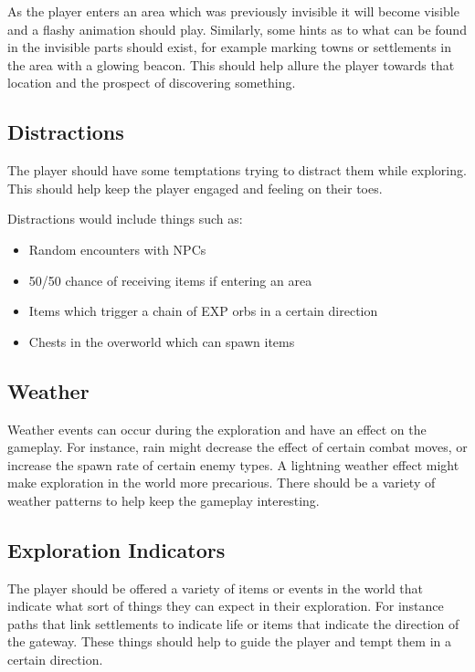\documentclass[a4paper]{scrreprt}
\begin{document}
As the player enters an area which was previously invisible it will become visible and a flashy animation should play.
Similarly, some hints as to what can be found in the invisible parts should exist, for example marking towns or settlements in the area with a glowing beacon.
This should help allure the player towards that location and the prospect of discovering something.

\subsection{Distractions}
The player should have some temptations trying to distract them while exploring.
This should help keep the player engaged and feeling on their toes.

Distractions would include things such as:

    \begin{itemize}
        \item Random encounters with NPCs
        \item 50/50 chance of receiving items if entering an area
        \item Items which trigger a chain of EXP orbs in a certain direction
        \item Chests in the overworld which can spawn items
    \end{itemize}

\subsection{Weather}
Weather events can occur during the exploration and have an effect on the gameplay.
For instance, rain might decrease the effect of certain combat moves, or increase the spawn rate of certain enemy types.
A lightning weather effect might make exploration in the world more precarious.
There should be a variety of weather patterns to help keep the gameplay interesting.

\subsection{Exploration Indicators}
The player should be offered a variety of items or events in the world that indicate what sort of things they can expect in their exploration.
For instance paths that link settlements to indicate life or items that indicate the direction of the gateway.
These things should help to guide the player and tempt them in a certain direction.
\end{document}

